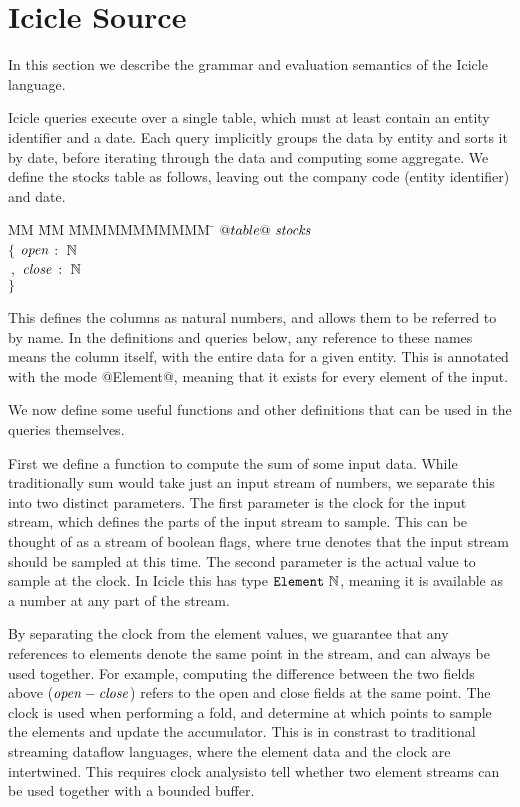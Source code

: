 \section{Icicle Source}
\label{s:Source}

In this section we describe the grammar and evaluation semantics of the Icicle language.

Icicle queries execute over a single table, which must at least contain an entity identifier and a date.
Each query implicitly groups the data by entity and sorts it by date, before iterating through the data and computing some aggregate.
We define the stocks table as follows, leaving out the company code (entity identifier) and date.

\begin{tabbing}
MM \= MM \= MMMMMMMMMMM \= \kill
$@table@~\mathit{stocks}$    \\
$\{$ \> $\mathit{open}$ \> $:~\mathbb{N}$ \\
$~,$ \> $\mathit{close}$ \> $:~\mathbb{N}$ \\
$\}$
\end{tabbing}

This defines the columns as natural numbers, and allows them to be referred to by name.
In the definitions and queries below, any reference to these names means the column itself, with the entire data for a given entity.
This is annotated with the mode @Element@, meaning that it exists for every element of the input.

We now define some useful functions and other definitions that can be used in the queries themselves.

First we define a function to compute the sum of some input data.
While traditionally sum would take just an input stream of numbers, we separate this into two distinct parameters.
The first parameter is the clock for the input stream, which defines the parts of the input stream to sample.
This can be thought of as a stream of boolean flags, where true denotes that the input stream should be sampled at this time.
The second parameter is the actual value to sample at the clock.
In Icicle this has type $\mathtt{Element}~\mathbb{N}$, meaning it is available as a number at any part of the stream.

By separating the clock from the element values, we guarantee that any references to elements denote the same point in the stream, and can always be used together.
For example, computing the difference between the two fields above ($\mathit{open} - \mathit{close}$) refers to the open and close fields at the same point.
The clock is used when performing a fold, and determine at which points to sample the elements and update the accumulator.
This is in constrast to traditional streaming dataflow languages, where the element data and the clock are intertwined.
This requires clock analysis\CITE to tell whether two element streams can be used together with a bounded buffer.

